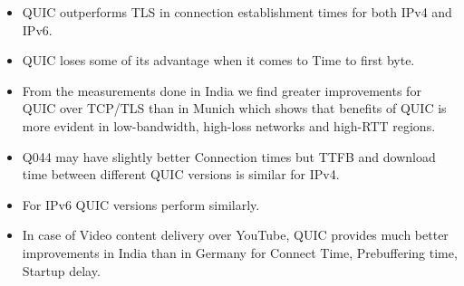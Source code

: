 \begin{frame}
    \begin{itemize}

\item QUIC outperforms TLS in connection establishment times for both IPv4 and IPv6.

\item QUIC loses some of its advantage when it comes to Time to first byte.

\item From the measurements done in India we find greater improvements for QUIC over TCP/TLS than in Munich which shows that benefits of QUIC is more evident in low-bandwidth, high-loss networks and high-RTT regions. 


\item Q044 may have slightly better Connection times but TTFB and download time between different QUIC versions is similar for IPv4.

\item For IPv6 QUIC versions perform similarly.

\item In case of Video content delivery over YouTube, QUIC provides much better improvements in India than in Germany for Connect Time, Prebuffering time, Startup delay.


\end{itemize}
\end{frame}

